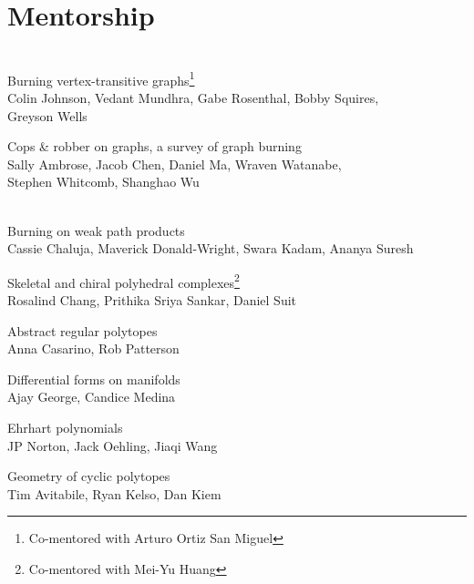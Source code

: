 \section*{Mentorship}
\\%
Burning vertex-transitive graphs\footnote{Co-mentored with Arturo Ortiz San Miguel}\\%
\makebox[8em][l]{}Colin Johnson, Vedant Mundhra, Gabe Rosenthal, Bobby Squires,\\%
\makebox[8em][l]{}Greyson Wells
\smallskip

Cops \& robber on graphs, a survey of graph burning\footnotemark[1]\\%
\makebox[8em][l]{}Sally Ambrose, Jacob Chen, Daniel Ma, Wraven Watanabe,\\%
\makebox[8em][l]{}Stephen Whitcomb, Shanghao Wu
\medskip

\\%
Burning on weak path products\footnotemark[1]\\%
\makebox[8em][l]{}Cassie Chaluja, Maverick Donald-Wright, Swara Kadam, Ananya Suresh
\smallskip

Skeletal and chiral polyhedral complexes\footnote{Co-mentored with Mei-Yu Huang}\\%
\makebox[8em][l]{}Rosalind Chang, Prithika Sriya Sankar, Daniel Suit
\smallskip

Abstract regular polytopes\\%
\makebox[8em][l]{}Anna Casarino, Rob Patterson
\smallskip

Differential forms on manifolds\\%
\makebox[8em][l]{}Ajay George, Candice Medina
\smallskip

Ehrhart polynomials\\%
\makebox[8em][l]{}JP Norton, Jack Oehling, Jiaqi Wang
\smallskip

Geometry of cyclic polytopes\\%
\makebox[8em][l]{}Tim Avitabile, Ryan Kelso, Dan Kiem